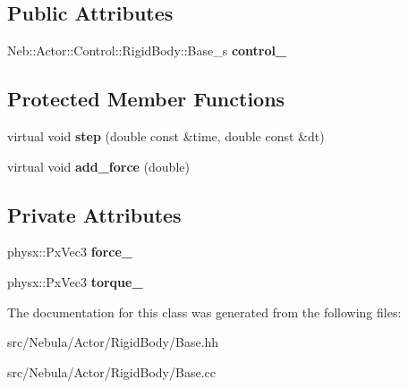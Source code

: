 \subsection*{\-Public \-Attributes}
\begin{DoxyCompactItemize}
\item 
\hypertarget{classNeb_1_1Actor_1_1RigidBody_1_1Base_a2de60916961ec44a1c4f6781a8f25a52}{\-Neb\-::\-Actor\-::\-Control\-::\-Rigid\-Body\-::\-Base\-\_\-s {\bfseries control\-\_\-}}\label{classNeb_1_1Actor_1_1RigidBody_1_1Base_a2de60916961ec44a1c4f6781a8f25a52}

\end{DoxyCompactItemize}
\subsection*{\-Protected \-Member \-Functions}
\begin{DoxyCompactItemize}
\item 
\hypertarget{classNeb_1_1Actor_1_1RigidBody_1_1Base_ad506b930b138b121848d052fdea3f5f1}{virtual void {\bfseries step} (double const \&time, double const \&dt)}\label{classNeb_1_1Actor_1_1RigidBody_1_1Base_ad506b930b138b121848d052fdea3f5f1}

\item 
\hypertarget{classNeb_1_1Actor_1_1RigidBody_1_1Base_a13cb8e22e64e25efeb17d8a031d99e73}{virtual void {\bfseries add\-\_\-force} (double)}\label{classNeb_1_1Actor_1_1RigidBody_1_1Base_a13cb8e22e64e25efeb17d8a031d99e73}

\end{DoxyCompactItemize}
\subsection*{\-Private \-Attributes}
\begin{DoxyCompactItemize}
\item 
\hypertarget{classNeb_1_1Actor_1_1RigidBody_1_1Base_a6d64b2ed705171d0e6cdcfd2abdfd73e}{physx\-::\-Px\-Vec3 {\bfseries force\-\_\-}}\label{classNeb_1_1Actor_1_1RigidBody_1_1Base_a6d64b2ed705171d0e6cdcfd2abdfd73e}

\item 
\hypertarget{classNeb_1_1Actor_1_1RigidBody_1_1Base_af35f75ac6ebf9605b83f0ec3b50ebb9e}{physx\-::\-Px\-Vec3 {\bfseries torque\-\_\-}}\label{classNeb_1_1Actor_1_1RigidBody_1_1Base_af35f75ac6ebf9605b83f0ec3b50ebb9e}

\end{DoxyCompactItemize}


\-The documentation for this class was generated from the following files\-:\begin{DoxyCompactItemize}
\item 
src/\-Nebula/\-Actor/\-Rigid\-Body/\-Base.\-hh\item 
src/\-Nebula/\-Actor/\-Rigid\-Body/\-Base.\-cc\end{DoxyCompactItemize}
